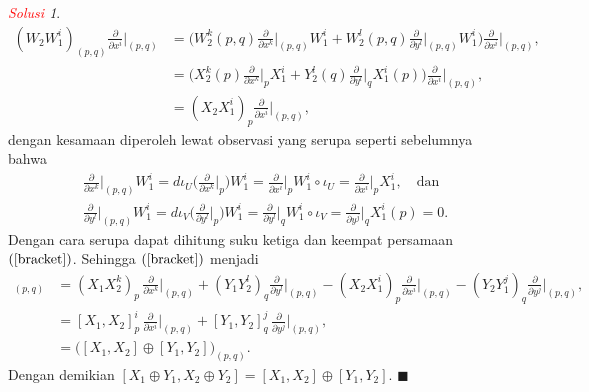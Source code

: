 \documentclass[11pt]{article}
\theoremstyle{definition}
\theoremstyle{remark}
\newtheorem*{solution}{\textcolor{red}{Solusi}}
\newcommand{\ddxi}{\frac{\partial}{\partial x^i}}
\newcommand{\ddxk}{\frac{\partial}{\partial x^k}}
\newcommand{\ddyj}{\frac{\partial}{\partial y^j}}
\newcommand{\ddyl}{\frac{\partial}{\partial y^l}}
\begin{document}
\begin{solution}
\begin{align*}
    (W_2 W_1^i)_{(p,q)} \ddxi\Big|_{(p,q)}&=  \Big( W_2^k(p,q) \ddxk\Big|_{(p,q)} W_1^i + W_2^l(p,q) \ddyl\Big|_{(p,q)} W_1^i \Big) \ddxi\Big|_{(p,q)}, \\
    &= \Big( X_2^k(p) \ddxk\Big|_p X_1^i + Y_2^l(q) \ddyl\Big|_q X_1^i(p) \Big) \ddxi\Big|_{(p,q)}, \\
    &= (X_2X_1^i)_p \ddxi\Big|_{(p,q)},
\end{align*}
dengan kesamaan diperoleh lewat observasi yang serupa seperti sebelumnya bahwa
\begin{align*}
    &\ddxk\Big|_{(p,q)} W_1^i = d\iota_U\Big( \ddxk\Big|_p \Big) W_1^i = \ddxi\Big|_p W_1^i \circ \iota_U =  \ddxi\Big|_p X_1^i,  \quad \text{dan} \\
    &\ddyl\Big|_{(p,q)} W_1^i = d\iota_V \Big( \ddyl\Big|_p \Big) W_1^i = \ddyl\Big|_q W_1^i \circ \iota_V = \ddyj\Big|_q X_1^i(p) = 0. 
\end{align*}
Dengan cara serupa dapat dihitung suku ketiga dan keempat persamaan $(\ref{bracket})$. Sehingga $(\ref{bracket})$ menjadi
\begin{align*}
    [X_1 \oplus Y_1,X_2 \oplus Y_2]_{(p,q)} &= (X_1 X_2^k)_p\, \ddxk\Big|_{(p,q)} + (Y_1Y_2^l)_q \ddyl\Big|_{(p,q)}  - (X_2X_1^i)_p \ddxi\Big|_{(p,q)} - (Y_2Y_1^j)_q \ddyj\Big|_{(p,q)}, \\
    &= [X_1,X_2]^i_p \, \ddxi\Big|_{(p,q)} + [Y_1,Y_2]^j_q \, \ddyj\Big|_{(p,q)}, \\
    &= \big( [X_1,X_2] \oplus [Y_1,Y_2] \big)_{(p,q)}.
\end{align*}
Dengan demikian $[X_1 \oplus Y_1,X_2 \oplus Y_2] =  [X_1,X_2] \oplus [Y_1,Y_2]$. $\blacksquare$
\end{solution}
\end{document}
